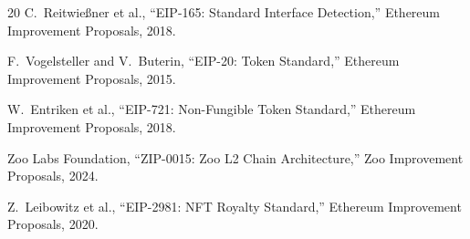 \documentclass[11pt,letterpaper]{article}
\begin{document}
\begin{thebibliography}{20}
C.~Reitwie{\ss}ner et al., ``EIP-165: Standard Interface Detection,'' Ethereum Improvement Proposals, 2018.

F.~Vogelsteller and V.~Buterin, ``EIP-20: Token Standard,'' Ethereum Improvement Proposals, 2015.

W.~Entriken et al., ``EIP-721: Non-Fungible Token Standard,'' Ethereum Improvement Proposals, 2018.

Zoo Labs Foundation, ``ZIP-0015: Zoo L2 Chain Architecture,'' Zoo Improvement Proposals, 2024.

Z.~Leibowitz et al., ``EIP-2981: NFT Royalty Standard,'' Ethereum Improvement Proposals, 2020.

\end{thebibliography}
\end{document}
